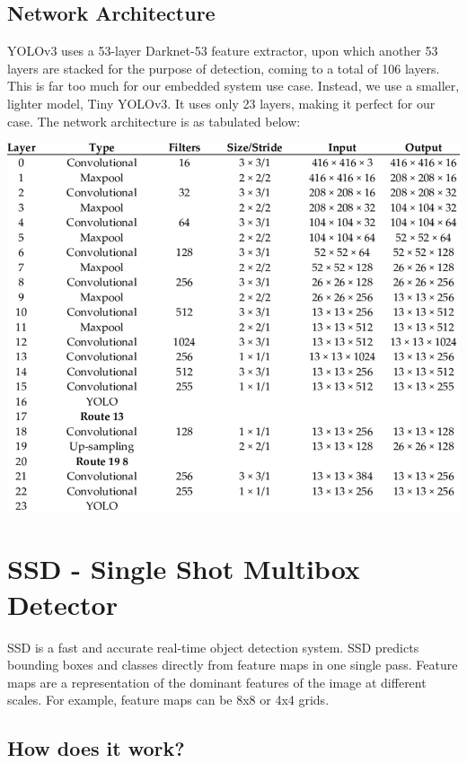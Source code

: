 \documentclass[12pt,letterpaper]{article}
\begin{document}
\subsection{Network Architecture}

YOLOv3 uses a 53-layer Darknet-53 feature extractor, upon which another 53 layers are stacked for the purpose of detection, coming to a total of 106 layers. This is far too much for our embedded system use case. Instead, we use a smaller, lighter model, Tiny YOLOv3.  It uses only 23 layers, making it perfect for our case. The network architecture is as tabulated below:

\includegraphics[width=\textwidth,keepaspectratio]{assets/darknettable.png}

\section{SSD - Single Shot Multibox Detector}

SSD is a fast and accurate real-time object detection system. SSD predicts bounding boxes and classes directly from feature maps in one single pass. Feature maps are a representation of the dominant features of the image at different scales. For example, feature maps can be 8x8 or 4x4 grids.

\subsection{How does it work?}
\end{document}
